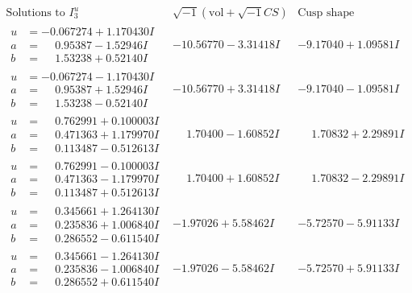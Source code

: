 \documentclass[1p]{elsarticle_modified}
\theoremstyle{definition}
\newcommand{\I}{\sqrt{-1}}
\begin{document}
$$\begin{array}{c|c|c}  
\text{Solutions to }I^u_{3}& \I (\text{vol} + \sqrt{-1}CS) & \text{Cusp shape}\\
 \hline 
\begin{aligned}
u &= -0.067274 + 1.170430 I \\
a &= \phantom{-}0.95387 - 1.52946 I \\
b &= \phantom{-}1.53238 + 0.52140 I\end{aligned}
 & -10.56770 - 3.31418 I & -9.17040 + 1.09581 I \\ \hline\begin{aligned}
u &= -0.067274 - 1.170430 I \\
a &= \phantom{-}0.95387 + 1.52946 I \\
b &= \phantom{-}1.53238 - 0.52140 I\end{aligned}
 & -10.56770 + 3.31418 I & -9.17040 - 1.09581 I \\ \hline\begin{aligned}
u &= \phantom{-}0.762991 + 0.100003 I \\
a &= \phantom{-}0.471363 + 1.179970 I \\
b &= \phantom{-}0.113487 - 0.512613 I\end{aligned}
 & \phantom{-}1.70400 - 1.60852 I & \phantom{-}1.70832 + 2.29891 I \\ \hline\begin{aligned}
u &= \phantom{-}0.762991 - 0.100003 I \\
a &= \phantom{-}0.471363 - 1.179970 I \\
b &= \phantom{-}0.113487 + 0.512613 I\end{aligned}
 & \phantom{-}1.70400 + 1.60852 I & \phantom{-}1.70832 - 2.29891 I \\ \hline\begin{aligned}
u &= \phantom{-}0.345661 + 1.264130 I \\
a &= \phantom{-}0.235836 + 1.006840 I \\
b &= \phantom{-}0.286552 - 0.611540 I\end{aligned}
 & -1.97026 + 5.58462 I & -5.72570 - 5.91133 I \\ \hline\begin{aligned}
u &= \phantom{-}0.345661 - 1.264130 I \\
a &= \phantom{-}0.235836 - 1.006840 I \\
b &= \phantom{-}0.286552 + 0.611540 I\end{aligned}
 & -1.97026 - 5.58462 I & -5.72570 + 5.91133 I \\ \hline\begin{aligned}

\end{aligned}
\end{array}$$
\end{document}
